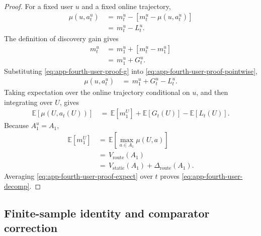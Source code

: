 \documentclass{article} %
\begin{document}
\begin{proof}
For a fixed user \(u\) and a fixed online trajectory,
\begin{align}
\label{eq:app-fourth-user-proof-pointwise}
\mu(u,a_t^u)
&\,=\,
m_t^u
-
\left[
m_t^u-\mu(u,a_t^u)
\right]
\\
&\,=\,
m_t^u
-
L_t^u.
\end{align}
The definition of discovery gain gives
\begin{align}
\label{eq:app-fourth-user-proof-g}
m_t^u
&\,=\,
m_1^u
+
\left[
m_t^u-m_1^u
\right]
\\
&\,=\,
m_1^u
+
G_t^u.
\end{align}
Substituting \eqref{eq:app-fourth-user-proof-g} into \eqref{eq:app-fourth-user-proof-pointwise},
\begin{align}
\label{eq:app-fourth-user-proof-pointwise-final}
\mu(u,a_t^u)
&\,=\,
m_1^u
+
G_t^u
-
L_t^u.
\end{align}
Taking expectation over the online trajectory conditional on \(u\), and then integrating over \(U\), gives
\begin{align}
\label{eq:app-fourth-user-proof-expect}
\mathbb{E}[\mu(U,a_t(U))]
&\,=\,
\mathbb{E}[m_1^U]
+
\mathbb{E}[G_t(U)]
-
\mathbb{E}[L_t(U)].
\end{align}
Because \(A_1^u=A_1\),
\begin{align}
\label{eq:app-fourth-user-proof-initial}
\mathbb{E}[m_1^U]
&\,=\,
\mathbb{E}\!\left[
\max_{a\in A_1}
\mu(U,a)
\right]
\\
&\,=\,
V_{\mathrm{route}}(A_1)
\\
&\,=\,
V_{\mathrm{static}}(A_1)
+
\Delta_{\mathrm{route}}(A_1).
\end{align}
Averaging \eqref{eq:app-fourth-user-proof-expect} over \(t\) proves \eqref{eq:app-fourth-user-decomp}.
\end{proof}

\subsection{Finite-sample identity and comparator correction}
\end{document}
